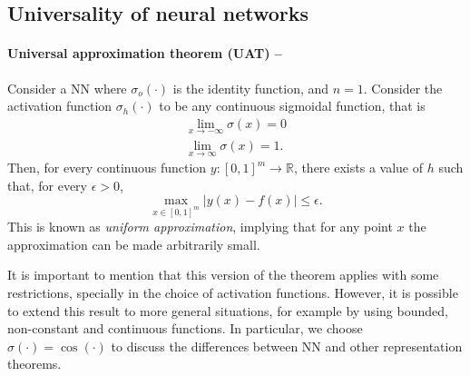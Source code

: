 \documentclass[]{report}
\begin{document}
\subsection{Universality of neural networks}

\paragraph{Universal approximation theorem (UAT) \cite{cybenko1989approximation} --}Consider a NN where $\sigma_o(\cdot)$ is the identity function, and $n = 1$. Consider the activation function $\sigma_h(\cdot)$ to be any continuous sigmoidal function, that is 
\begin{align}
\lim_{x \rightarrow -\infty} \sigma(x) = 0 \\
\lim_{x \rightarrow \infty} \sigma(x) = 1.
\end{align}
Then, for every continuous function $
y:[0, 1]^m \rightarrow \mathbb R$, there exists a value of $h$ such that, for every $\epsilon > 0$, 
\begin{equation}
\max_{x \in [0, 1]^m} \left\vert y(x) - f(x)\right\vert \leq \epsilon.
\end{equation}
This is known as \textit{uniform approximation}, implying that for any point $x$ the approximation can be made arbitrarily small. 

It is important to mention that this version of the theorem applies with some restrictions, specially in the choice of activation functions. However, it is possible to extend this result to more general situations, for example by using bounded, non-constant and continuous functions. In particular, we choose $\sigma(\cdot) = \cos(\cdot)$ to discuss the differences between NN and other representation theorems. 
\end{document}
